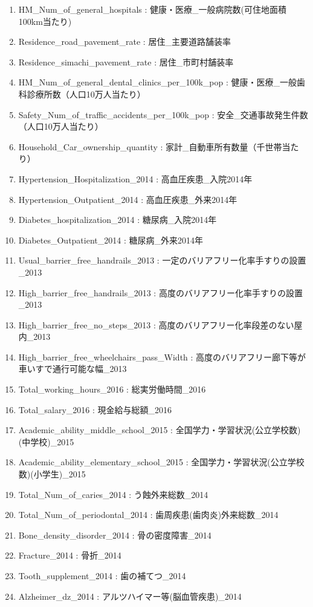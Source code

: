 \begin{enumerate}
  \item   HM\_Num\_of\_general\_hospitals  :   健康・医療\_一般病院数(可住地面積100km当たり)
  \item   Residence\_road\_pavement\_rate  :   居住\_主要道路舗装率
  \item   Residence\_simachi\_pavement\_rate  :   居住\_市町村舗装率 \item   HM\_Num\_of\_general\_dental\_clinics\_per\_100k\_pop  :   健康・医療\_一般歯科診療所数（人口10万人当たり）
  \item   Safety\_Num\_of\_traffic\_accidents\_per\_100k\_pop  :   安全\_交通事故発生件数（人口10万人当たり）
  \item   Household\_Car\_ownership\_quantity  :   家計\_自動車所有数量（千世帯当たり）
  \item   Hypertension\_Hospitalization\_2014  :   高血圧疾患\_入院2014年
  \item   Hypertension\_Outpatient\_2014  :   高血圧疾患\_外来2014年
  \item   Diabetes\_hospitalization\_2014  :   糖尿病\_入院2014年
  \item   Diabetes\_Outpatient\_2014  :   糖尿病\_外来2014年
  \item   Usual\_barrier\_free\_handrails\_2013  :   一定のバリアフリー化率手すりの設置\_2013
  \item   High\_barrier\_free\_handrails\_2013  :   高度のバリアフリー化率手すりの設置\_2013
  \item   High\_barrier\_free\_no\_steps\_2013  :   高度のバリアフリー化率段差のない屋内\_2013
  \item   High\_barrier\_free\_wheelchairs\_pass\_Width  :   高度のバリアフリー廊下等が車いすで通行可能な幅\_2013
  \item   Total\_working\_hours\_2016  :   総実労働時間\_2016
  \item   Total\_salary\_2016  :   現金給与総額\_2016
  \item   Academic\_ability\_middle\_school\_2015  :   全国学力・学習状況(公立学校数)(中学校)\_2015
  \item   Academic\_ability\_elementary\_school\_2015  :   全国学力・学習状況(公立学校数)(小学生)\_2015
  \item   Total\_Num\_of\_caries\_2014  :   う蝕外来総数\_2014
  \item   Total\_Num\_of\_periodontal\_2014  :   歯周疾患(歯肉炎)外来総数\_2014
  \item   Bone\_density\_disorder\_2014  :   骨の密度障害\_2014
  \item   Fracture\_2014  :   骨折\_2014
  \item   Tooth\_supplement\_2014  :   歯の補てつ\_2014
  \item   Alzheimer\_dz\_2014  :   アルツハイマー等(脳血管疾患)\_2014

\end{enumerate}


